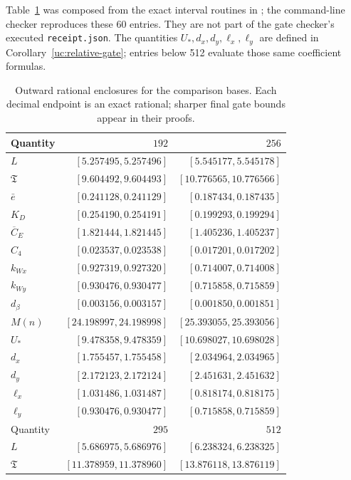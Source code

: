 Table~\ref{uc:base-values} was composed from the exact interval routines in
; the command-line checker
 reproduces these 60 entries.
They are not part of the gate checker's executed \texttt{receipt.json}. The quantities
$U_*,d_x,d_y,\ell_x,\ell_y$ are defined in
Corollary~\ref{uc:relative-gate}; entries below 512 evaluate those same
coefficient formulas.
\begin{table}[!htbp]
\centering\small
\caption{Outward rational enclosures for the comparison bases. Each decimal endpoint is an exact rational; sharper final gate bounds appear in their proofs.}
\label{uc:base-values}
\begin{tabular}{@{}lrr@{}}\toprule
Quantity & $192$ & $256$\\\midrule
$L$ & $[5.257495,5.257496]$ & $[5.545177,5.545178]$\\
$\mathfrak T$ & $[9.604492,9.604493]$ & $[10.776565,10.776566]$\\
$\bar e$ & $[0.241128,0.241129]$ & $[0.187434,0.187435]$\\
$K_D$ & $[0.254190,0.254191]$ & $[0.199293,0.199294]$\\
$\overline C_E$ & $[1.821444,1.821445]$ & $[1.405236,1.405237]$\\
$C_4$ & $[0.023537,0.023538]$ & $[0.017201,0.017202]$\\
$k_{Wx}$ & $[0.927319,0.927320]$ & $[0.714007,0.714008]$\\
$k_{Wy}$ & $[0.930476,0.930477]$ & $[0.715858,0.715859]$\\
$d_\beta$ & $[0.003156,0.003157]$ & $[0.001850,0.001851]$\\
$M(n)$ & $[24.198997,24.198998]$ & $[25.393055,25.393056]$\\
$U_*$ & $[9.478358,9.478359]$ & $[10.698027,10.698028]$\\
$d_x$ & $[1.755457,1.755458]$ & $[2.034964,2.034965]$\\
$d_y$ & $[2.172123,2.172124]$ & $[2.451631,2.451632]$\\
$\ell_x$ & $[1.031486,1.031487]$ & $[0.818174,0.818175]$\\
$\ell_y$ & $[0.930476,0.930477]$ & $[0.715858,0.715859]$\\
\midrule Quantity & $295$ & $512$\\\midrule
$L$ & $[5.686975,5.686976]$ & $[6.238324,6.238325]$\\
$\mathfrak T$ & $[11.378959,11.378960]$ & $[13.876118,13.876119]$\\

\end{tabular}
\end{table}
